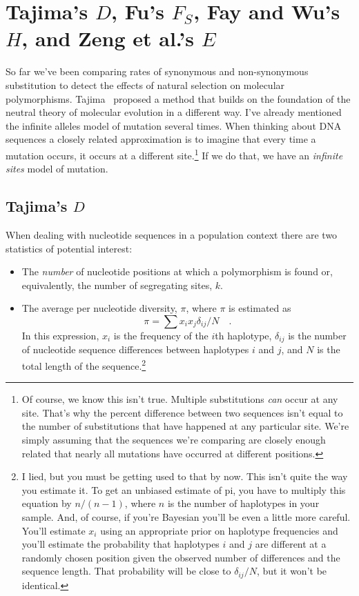 \chapter{Tajima's $D$, Fu's $F_S$, Fay and Wu's $H$, and Zeng et al.'s $E$}

So far we've been comparing rates of synonymous and non-synonymous
substitution to detect the effects of natural selection on molecular
polymorphisms. Tajima~\cite{Tajima89} proposed a method that builds on
the foundation of the neutral theory of molecular evolution in a
different way. I've already mentioned the infinite alleles model of
mutation several times. When thinking about DNA sequences a closely
related approximation is to imagine that every time a mutation occurs,
it occurs at a different site.\footnote{Of course, we know this isn't
  true. Multiple substitutions {\it can\/} occur at any site. That's
  why the percent difference between two sequences isn't equal to the
  number of substitutions that have happened at any particular
  site. We're simply assuming that the sequences we're comparing are
  closely enough related that nearly all mutations have occurred at
  different positions.} If we do that, we have an {\it infinite
  sites\/} model of mutation.

\section*{Tajima's $D$}

When dealing with nucleotide sequences in a population context there
are two statistics of potential interest:

\begin{itemize}

\item The {\it number\/} of nucleotide positions at which a
  polymorphism is found or, equivalently, the number of segregating
  sites, $k$.

\item The average per nucleotide diversity, $\pi$, where $\pi$ is
  estimated as
\[
\pi = \sum x_ix_j\delta_{ij}/N \quad .
\]
In this expression, $x_i$ is the frequency of the $i$th haplotype,
$\delta_{ij}$ is the number of nucleotide sequence differences between
haplotypes $i$ and $j$, and $N$ is the total length of the
sequence.\footnote{I lied, but you must be getting used to that by
  now. This isn't quite the way you estimate it. To get an unbiased
  estimate of pi, you have to multiply this equation by $n/(n-1)$,
  where $n$ is the number of haplotypes in your sample. And, of
  course, if you're Bayesian you'll be even a little more
  careful. You'll estimate $x_i$ using an appropriate prior on
  haplotype frequencies and you'll estimate the probability that
  haplotypes $i$ and $j$ are different at a randomly chosen position
  given the observed number of differences and the sequence
  length. That probability will be close to $\delta_{ij}/N$, but it
  won't be identical.}

\end{itemize}

